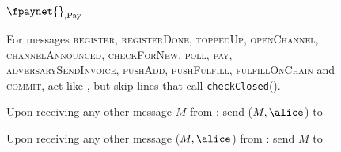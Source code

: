 \begin{figure}[!htbp]
  \begin{systembox}{$\fpaynet{}_{\mathrm{, Pay}}$}
    \begin{algorithmic}[1]
      \State For messages \textsc{register}, \textsc{registerDone},
      \textsc{toppedUp}, \textsc{openChannel}, \textsc{channelAnnounced},
      \textsc{checkForNew}, \textsc{poll}, \textsc{pay},
      \textsc{adversarySendInvoice}, \textsc{pushAdd},
      \textsc{pushFulfill}, \textsc{fulfillOnChain} and \textsc{commit}, act
      like \fpaynet{}, but skip lines that call \texttt{checkClosed}().
      \Statex

      \State Upon receiving any other message $M$ from \alice:
      \Indent
          \State send ($M, \alice$) to \simulator
        \EndIf
      \EndIndent
      \Statex

      \State Upon receiving any other message ($M, \alice$) from \simulator:
      \Indent
          \State send $M$ to \alice
        \EndIf
      \EndIndent
    \end{algorithmic}
  \end{systembox}
  \caption{}
  \label{alg:proof:fpaynet:pay}
\end{figure}


